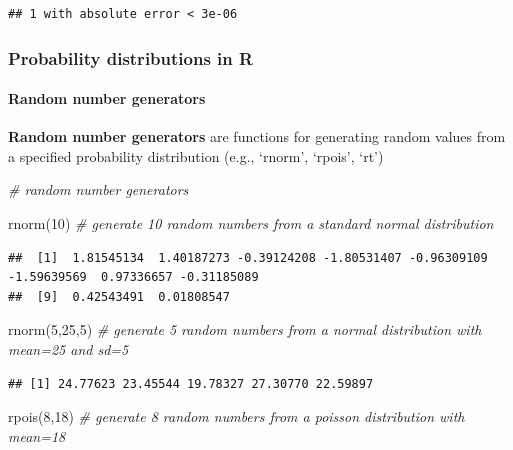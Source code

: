 \documentclass[
]{article}
\newenvironment{Shaded}{\begin{snugshade}}{\end{snugshade}}
\newcommand{\CommentTok}[1]{\textcolor[rgb]{0.56,0.35,0.01}{\textit{#1}}}
\newcommand{\DecValTok}[1]{\textcolor[rgb]{0.00,0.00,0.81}{#1}}
\newcommand{\FunctionTok}[1]{\textcolor[rgb]{0.00,0.00,0.00}{#1}}
\newcommand{\NormalTok}[1]{#1}
\begin{document}
\begin{verbatim}
## 1 with absolute error < 3e-06
\end{verbatim}

\hypertarget{probability-distributions-in-r}{%
\subsubsection{Probability distributions in
R}\label{probability-distributions-in-r}}

\hypertarget{random-number-generators}{%
\paragraph{Random number generators}\label{random-number-generators}}

\textbf{Random number generators} are functions for generating random
values from a specified probability distribution (e.g., `rnorm',
`rpois', `rt')

\begin{Shaded}
\begin{Highlighting}[]
\CommentTok{\# random number generators}

\FunctionTok{rnorm}\NormalTok{(}\DecValTok{10}\NormalTok{)    }\CommentTok{\# generate 10 random numbers from a standard normal distribution}
\end{Highlighting}
\end{Shaded}

\begin{verbatim}
##  [1]  1.81545134  1.40187273 -0.39124208 -1.80531407 -0.96309109 -1.59639569  0.97336657 -0.31185089
##  [9]  0.42543491  0.01808547
\end{verbatim}

\begin{Shaded}
\begin{Highlighting}[]
\FunctionTok{rnorm}\NormalTok{(}\DecValTok{5}\NormalTok{,}\DecValTok{25}\NormalTok{,}\DecValTok{5}\NormalTok{)  }\CommentTok{\# generate 5 random numbers from a normal distribution with mean=25 and sd=5}
\end{Highlighting}
\end{Shaded}

\begin{verbatim}
## [1] 24.77623 23.45544 19.78327 27.30770 22.59897
\end{verbatim}

\begin{Shaded}
\begin{Highlighting}[]
\FunctionTok{rpois}\NormalTok{(}\DecValTok{8}\NormalTok{,}\DecValTok{18}\NormalTok{)  }\CommentTok{\# generate 8 random numbers from a poisson distribution with mean=18}
\end{Highlighting}
\end{Shaded}
\end{document}
